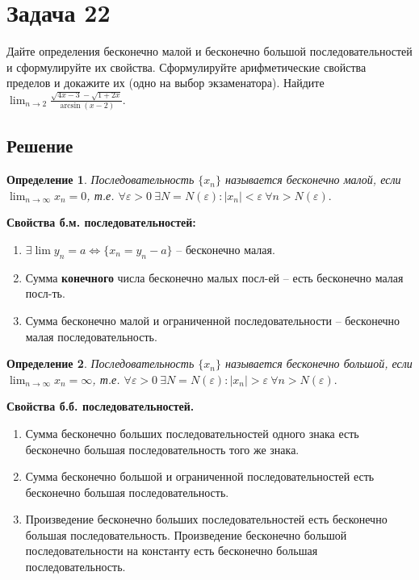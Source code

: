 \documentclass[a4paper,12pt]{article}
\newtheorem*{defi}{Определение}
\newcommand{\eps}{\varepsilon}
\begin{document}
    \section*{Задача 22}
    
    Дайте определения бесконечно малой и бесконечно большой последовательностей и сформулируйте их свойства. Сформулируйте арифметические свойства пределов и докажите их (одно на
выбор экзаменатора). Найдите $\displaystyle \lim_{n\rightarrow 2} 
            \frac{
                   \sqrt{4x - 3} -
                   \sqrt{1 + 2x}
                 }
                 {
                   \arcsin(x-2)
                 }.$
    
    \subsection*{Решение}
    
    \begin{defi} Последовательность $ \{ x_ n \} $ называется бесконечно малой, 
        если $\displaystyle \lim_{n \rightarrow \infty} x_n = 0$, т.е. 
        $\forall \eps > 0\ \exists N = N(\eps):|x_n| < \eps\ \forall n > N(\eps).$
    \end{defi}

    \textbf{Свойства б.м. последовательностей:}
        \begin{enumerate}
            \item $\exists \lim y_n = a \Leftrightarrow \{x_n = y_n - a\}$ -- бесконечно малая.
            \item Сумма \textbf{конечного} числа бесконечно малых посл-ей -- есть бесконечно малая посл-ть.
            \item Сумма бесконечно малой и ограниченной последовательности -- бесконечно малая последовательность.
        \end{enumerate}
    
    \begin{defi} Последовательность $ \{ x_ n \} $ называется бесконечно большой, 
        если $\displaystyle \lim_{n \rightarrow \infty} x_n = \infty$, т.е. 
        $\forall \eps > 0\ \exists N = N(\eps):|x_n| > \eps\ \forall n > N(\eps).$
    \end{defi}
    \textbf{Свойства б.б. последовательностей.}
        \begin{enumerate}
            \item Сумма бесконечно больших последовательностей одного знака есть бесконечно большая последовательность того же знака.
            \item Сумма бесконечно большой и ограниченной последовательностей есть бесконечно большая последовательность.
            \item Произведение бесконечно больших последовательностей есть бесконечно большая последовательность. Произведение бесконечно большой последовательности на константу есть бесконечно большая последовательность.
        \end{enumerate}
\end{document}
